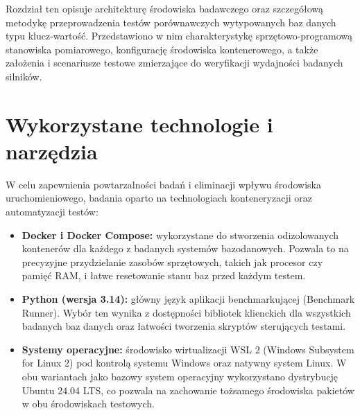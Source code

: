 Rozdział ten opisuje architekturę środowiska badawczego oraz szczegółową metodykę przeprowadzenia testów porównawczych wytypowanych baz danych typu klucz-wartość. Przedstawiono w nim charakterystykę sprzętowo-programową stanowiska pomiarowego, konfigurację środowiska kontenerowego, a także założenia i scenariusze testowe zmierzające do weryfikacji wydajności badanych silników.

\section{Wykorzystane technologie i narzędzia}
W celu zapewnienia powtarzalności badań i eliminacji wpływu środowiska uruchomieniowego, badania oparto na technologiach konteneryzacji oraz automatyzacji testów:
\begin{itemize}
    \item \textbf{Docker i Docker Compose:} wykorzystane do stworzenia odizolowanych kontenerów dla każdego z badanych systemów bazodanowych. Pozwala to na precyzyjne przydzielanie zasobów sprzętowych, takich jak procesor czy pamięć RAM, i łatwe resetowanie stanu baz przed każdym testem.
    \item \textbf{Python (wersja 3.14):} główny język aplikacji benchmarkującej (Benchmark Runner). Wybór ten wynika z dostępności bibliotek klienckich dla wszystkich badanych baz danych oraz łatwości tworzenia skryptów sterujących testami.
    \item \textbf{Systemy operacyjne:} środowisko wirtualizacji WSL 2 (Windows Subsystem for Linux 2) \cite{wslperf2021} pod kontrolą systemu Windows oraz natywny system Linux. W obu wariantach jako bazowy system operacyjny wykorzystano dystrybucję Ubuntu 24.04 LTS, co pozwala na zachowanie tożsamego środowiska pakietów w obu środowiskach testowych.
\end{itemize}


